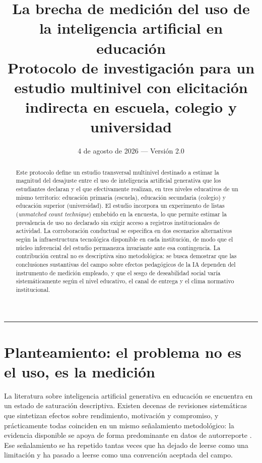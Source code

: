 \documentclass[11pt,a4paper]{article}
\title{\textbf{La brecha de medición del uso de la inteligencia artificial en educación}\\[0.35em]
	\large Protocolo de investigación para un estudio multinivel con elicitación indirecta en escuela, colegio y universidad}
\author{}
\date{4 de agosto de 2026 --- Versión 2.0}
\begin{document}
\maketitle
\thispagestyle{empty}

\begin{abstract}
	\noindent Este protocolo define un estudio transversal multinivel destinado a estimar la magnitud del desajuste entre el uso de inteligencia artificial generativa que los estudiantes declaran y el que efectivamente realizan, en tres niveles educativos de un mismo territorio: educación primaria (escuela), educación secundaria (colegio) y educación superior (universidad). El estudio incorpora un experimento de listas (\emph{unmatched count technique}) embebido en la encuesta, lo que permite estimar la prevalencia de uso no declarado sin exigir acceso a registros institucionales de actividad. La corroboración conductual se especifica en dos escenarios alternativos según la infraestructura tecnológica disponible en cada institución, de modo que el núcleo inferencial del estudio permanezca invariante ante esa contingencia. La contribución central no es descriptiva sino metodológica: se busca demostrar que las conclusiones sustantivas del campo sobre efectos pedagógicos de la IA dependen del instrumento de medición empleado, y que el sesgo de deseabilidad social varía sistemáticamente según el nivel educativo, el canal de entrega y el clima normativo institucional.
\end{abstract}

\vspace{0.6em}
\hrule
\vspace{1.2em}

\tableofcontents
\newpage

\section{Planteamiento: el problema no es el uso, es la medición}

La literatura sobre inteligencia artificial generativa en educación se encuentra en un estado de saturación descriptiva. Existen decenas de revisiones sistemáticas que sintetizan efectos sobre rendimiento, motivación y compromiso, y prácticamente todas coinciden en un mismo señalamiento metodológico: la evidencia disponible se apoya de forma predominante en datos de autorreporte \citep{alfarwan2025generative}. Ese señalamiento se ha repetido tantas veces que ha dejado de leerse como una limitación y ha pasado a leerse como una convención aceptada del campo.
\end{document}
